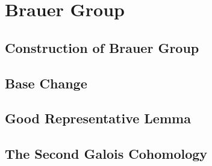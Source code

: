 \chapter{Brauer Group}\label{cha:brauer-group}

\section{Construction of Brauer Group}

\section{Base Change}

\section{Good Representative Lemma}

\section{The Second Galois Cohomology}

